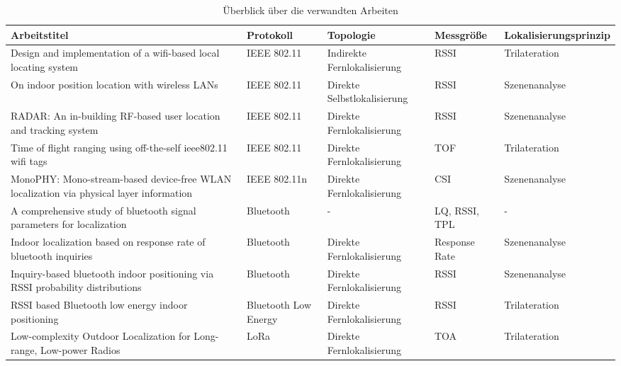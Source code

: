 \begin{table}[h!]
	\centering
	\caption{Überblick über die verwandten Arbeiten}
	\label{table:verwandte}
	\begin{tabular}{p{4.7cm}|p{1.6cm}|p{2cm}|p{2cm}|p{2.1cm}}
		Arbeitstitel & Protokoll & Topologie & Messgröße & Lokalisier\-ungsprinzip\\
		\hline
		Design and implementation of a wifi-based local locating system & IEEE 802.11 & Indirekte Fernlokalisierung & RSSI & Trilateration \\
		\hline
		On indoor position location with wireless LANs & IEEE 802.11 & Direkte Selbstlokalisierung & RSSI & Szenenanalyse \\
		\hline
		RADAR: An in-building RF-based user location and tracking system & IEEE 802.11 & Direkte Fernlokalisierung & RSSI & Szenenanalyse \\
		\hline
		Time of flight ranging using off-the-self ieee802.11 wifi tags & IEEE 802.11 & Direkte Fernlokalisierung & TOF & Trilateration \\
		\hline
		MonoPHY: Mono-stream-based device-free WLAN localization via physical layer information & IEEE 802.11n & Direkte Fernlokalisierung & CSI & Szenenanalyse \\
		\hline
		A comprehensive study of bluetooth
signal parameters for localization & Bluetooth & - & LQ, RSSI, TPL & - \\
		\hline
		Indoor localization based on response
rate of bluetooth inquiries & Bluetooth & Direkte Fernlokalisierung & Response Rate & Szenenanalyse \\
		\hline
		Inquiry-based bluetooth indoor positioning via RSSI probability distributions & Bluetooth & Direkte Fernlokalisierung & RSSI & Szenenanalyse \\
		\hline
		RSSI based Bluetooth low energy indoor positioning & Bluetooth Low Energy & Direkte Fernlokalisierung & RSSI & Trilateration \\
		\hline
		Low-complexity Outdoor Localization for Long-range, Low-power Radios & LoRa & Direkte Fernlokalisierung & TOA & Trilateration \\
	\end{tabular}
\end{table}

